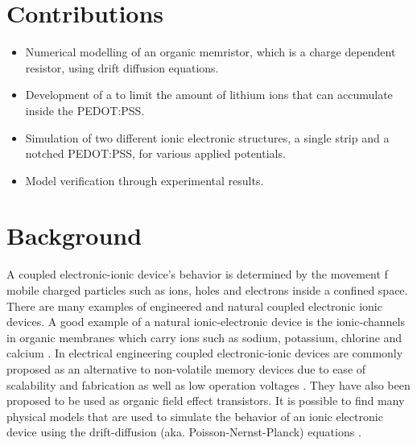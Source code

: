 \begin{doublespace}
\section{Contributions}

\begin{itemize}
  \item Numerical modelling of an organic memristor, which is a charge dependent resistor, using drift diffusion equations.  
  \item Development of a  to  limit the amount of lithium ions that can accumulate inside the PEDOT:PSS.
  \item Simulation of two different ionic electronic structures, a single strip and a notched PEDOT:PSS, for various applied potentials.
  \item Model verification through experimental results.
\end{itemize}

\section{Background}

A coupled electronic-ionic device's behavior is determined by the movement f mobile charged particles such as ions, holes and electrons inside a confined space. There are many examples of engineered and natural coupled electronic ionic devices. A good example of a natural ionic-electronic device is the ionic-channels in organic membranes which carry ions such as sodium, potassium, chlorine and calcium \cite{electrodiff}\cite{GramacidinChannel}. In electrical engineering coupled electronic-ionic devices are commonly proposed as an alternative to non-volatile memory devices due to ease of scalability and fabrication as well as low operation voltages \cite{IonicMemoryDev}\cite{NanoScaleMemEle}. They have also been proposed to be used as organic field effect transistors\cite{OrganicFet}. It is possible to find many physical models that are used to simulate the behavior of an ionic electronic device using the drift-diffusion (aka. Poisson-Nernst-Planck) equations \cite{IonicMemoryDev}\cite{OrganicMemSim}\cite{NumericalPNP}.


\end{doublespace}
